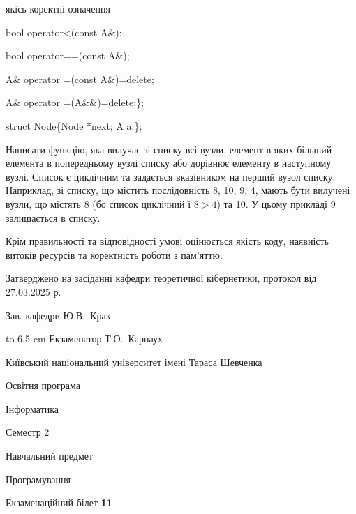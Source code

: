 \documentclass[12pt, ukrainian]{article}
\begin{document}
{\quad  якісь коректні означення 

\quad  bool operator<(const A\&); 

\quad  bool operator==(const A\&); 

\quad A\& operator =(const A\&)=delete; 

\quad  A\& operator =(A\&\&)=delete;\};

struct Node\{Node *next; A a;\};

 Написати функцію, яка вилучає зі списку всі вузли, елемент в яких більший елемента в попередньому вузлі списку або дорівнює елементу в наступному вузлі. Список є циклічним та задається вказівником на перший вузол списку. Наприклад, зі списку, що містить послідовність 8, 10, 9, 4, мають бути вилучені вузли, що містять 8 (бо список циклічний і $8>4$) та 10. У цьому прикладі 9 залишається в списку.

Крім правильності та відповідності умові оцінюється якість коду, наявність витоків ресурсів та коректність роботи з пам'яттю. 

}
{\smallskip\smallskip \begin {scriptsize} Затверджено на засіданні кафедри теоретичної кібернетики, протокол   від   27.03.2025 р.\par\smallskip\smallskip\smallskip\smallskip
{\parbox {6.5 cm} {Зав. кафедри \dotfill Ю.В.~Крак}}\hspace {0.7cm} {\hbox to 6.5 cm { Екзаменатор \dotfill Т.О.~Карнаух}} \end{scriptsize}}
\newpage
{{\begin {scriptsize}\par
{ \center  Київський національний університет імені Тараса Шевченка \par}
{\parbox {5 cm}{Освітня програма \hfill}{\parbox {7 cm}{Інформатика\hfill}}\parbox {6 cm}{\hfill Семестр 2}}\par
{\parbox {5 cm} {Навчальний предмет \hfill}\parbox {7 cm}{Програмування \hfill}\parbox {6cm}{\hfill}\par}\vspace{-15pt} \end{scriptsize}}{\center Екзаменаційний білет \No \textbf { 11 }\par}}
\end{document}
